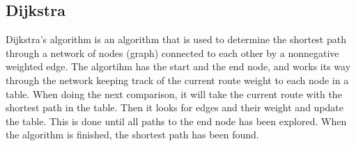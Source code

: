 \subsection{Dijkstra}
Dijkstra's algorithm\cite{Dijkstra:Info} is an algorithm that is used to determine the shortest path through a network of nodes (graph) connected to each other by a nonnegative weighted edge. The algortihm has the start and the end node, and works its way through the network keeping track of the current route weight to each node in a table. When doing the next comparison, it will take the current route with the shortest path in the table. Then it looks for edges and their weight and update the table. This is done until all paths to the end node has been explored. When the algorithm is finished, the shortest path has been found.